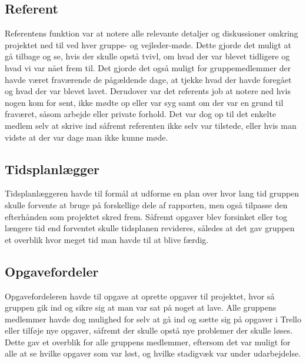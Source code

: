 \subsection*{Referent}\label{Referent}
Referentens funktion var at notere alle relevante detaljer og diskussioner omkring projektet ned til ved hver gruppe- og vejleder-møde. Dette gjorde det muligt at gå tilbage og se, hvis der skulle opstå tvivl, om hvad der var blevet tidligere og hvad vi var nået frem til. Det gjorde det også muligt for gruppemedlemmer der havde været fraværende de pågældende dage, at tjekke hvad der havde foregået og hvad der var blevet lavet. Derudover var det referents job at notere ned hvis nogen kom for sent, ikke mødte op eller var syg samt om der var en grund til fraværet, såsom arbejde eller private forhold. Det var dog op til det enkelte medlem selv at skrive ind såfremt referenten ikke selv var tilstede, eller hvis man vidste at der var dage man ikke kunne møde.  

\subsection*{Tidsplanlægger}\label{Tidsplanlaegger}
Tidsplanlæggeren havde til formål at udforme en plan over hvor lang tid gruppen skulle forvente at bruge på forskellige dele af rapporten, men også tilpasse den efterhånden som projektet skred frem. Såfremt opgaver blev forsinket eller tog længere tid end forventet skulle tidsplanen revideres, således at det gav gruppen et overblik hvor meget tid man havde til at blive færdig.

\subsection*{Opgavefordeler}\label{Opgavefordeler}
Opgavefordeleren havde til opgave at oprette opgaver til projektet, hvor så gruppen gik ind og sikre sig at man var sat på noget at lave. Alle gruppens medlemmer havde dog mulighed for selv at gå ind og sætte sig på opgaver i Trello eller tilføje nye opgaver, såfremt der skulle opstå nye problemer der skulle løses. Dette gav et overblik for alle gruppens medlemmer, eftersom det var muligt for alle at se hvilke opgaver som var løst, og hvilke stadigvæk var under udarbejdelse.


